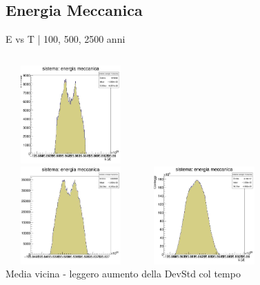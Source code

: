 \subsection[E]{Energia Meccanica}
        \begin{frame}{E vs T | 100, 500, 2500 anni}
            \begin{columns}
                    \centering        
                    \includegraphics[width=5cm,height=3.75cm]{4_energia/E_100_3600.jpg}\\
                    \includegraphics[width=5cm,height=3.75cm]{4_energia/E_500_3600.jpg}
                    \label{cfr::ET}              
                    \centering        
                    \includegraphics[width=5cm,height=3.75cm]{4_energia/E_2500_3600_stretto.jpg}\\
                    \label{cfr::ET1}
                    Media vicina - leggero aumento della DevStd col tempo
            \end{columns}
        \end{frame}
